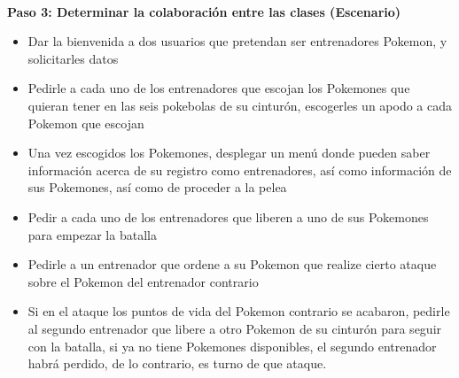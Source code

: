 \documentclass[a4paper,11pt]{report}
\begin{document}
\textbf{\\Paso 3: Determinar la colaboración entre las clases (Escenario)}
\begin{itemize}
\item Dar la bienvenida a dos usuarios que pretendan ser entrenadores Pokemon, y solicitarles datos
\item Pedirle a cada uno de los entrenadores que escojan los Pokemones que quieran tener en las seis pokebolas de su cinturón, escogerles un apodo a cada Pokemon que escojan
\item Una vez escogidos los Pokemones, desplegar un menú donde pueden saber información acerca de su registro como entrenadores, así como información de sus Pokemones, así como de proceder a la pelea
\item Pedir a cada uno de los entrenadores que liberen a uno de sus Pokemones para empezar la batalla
\item Pedirle a un entrenador que ordene a su Pokemon que realize cierto ataque sobre el Pokemon del entrenador contrario
\item Si en el ataque los puntos de vida del Pokemon contrario se acabaron, pedirle al segundo entrenador que libere a otro Pokemon de su cinturón para seguir con la batalla, si ya no tiene Pokemones disponibles, el segundo entrenador habrá perdido, de lo contrario, es turno de que ataque.
\end{itemize}
\end{document}
